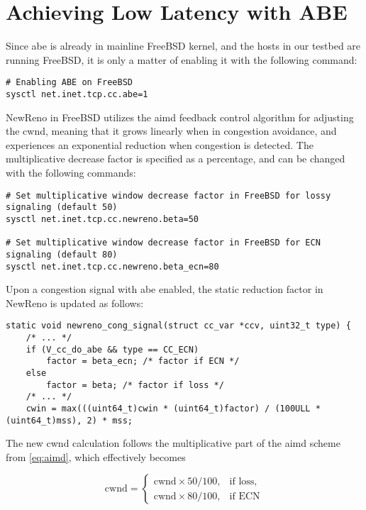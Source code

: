 \section{Achieving Low Latency with ABE}

Since \gls{abe} is already in mainline FreeBSD kernel, \cite{rfc8511} and the hosts in our testbed are running FreeBSD, it is only a matter of enabling it with the following command:

\begin{verbatim}
# Enabling ABE on FreeBSD
sysctl net.inet.tcp.cc.abe=1
\end{verbatim}
NewReno in FreeBSD utilizes the \gls{aimd} feedback control algorithm for adjusting the \gls{cwnd}, meaning that it grows linearly when in congestion avoidance, and experiences an exponential reduction when congestion is detected. The multiplicative decrease factor is specified as a percentage, and can be changed with the following commands:

\begin{verbatim}
# Set multiplicative window decrease factor in FreeBSD for lossy signaling (default 50)
sysctl net.inet.tcp.cc.newreno.beta=50

# Set multiplicative window decrease factor in FreeBSD for ECN signaling (default 80)
sysctl net.inet.tcp.cc.newreno.beta_ecn=80
\end{verbatim}
Upon a congestion signal with \gls{abe} enabled, the static reduction factor in NewReno is updated as follows:

\begin{verbatim}
static void newreno_cong_signal(struct cc_var *ccv, uint32_t type) {
    /* ... */
    if (V_cc_do_abe && type == CC_ECN)
        factor = beta_ecn; /* factor if ECN */
    else
        factor = beta; /* factor if loss */
    /* ... */
    cwin = max(((uint64_t)cwin * (uint64_t)factor) / (100ULL * (uint64_t)mss), 2) * mss;
\end{verbatim}
The new \gls{cwnd} calculation follows the multiplicative part of the \gls{aimd} scheme from \ref{eq:aimd}, which effectively becomes

\begin{equation} \label{eq:cwnd_newreno}
    \mathrm{cwnd} = \begin{cases}
        \mathrm{cwnd} \times 50/100, & \text{if loss},\\
        \mathrm{cwnd} \times 80/100, & \text{if ECN}
    \end{cases}
\end{equation}

